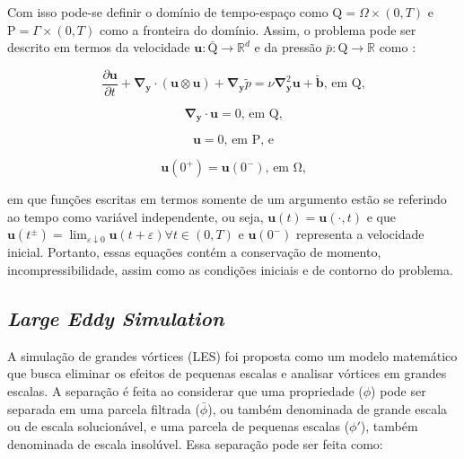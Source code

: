 \documentclass[_ArquivoPrincipal.tex]{subfiles}
\begin{document}
Com isso pode-se definir o domínio de tempo-espaço como $\mathrm{Q}=\Omega\times(0,T)$ e $\mathrm{P}=\Gamma\times(0,T)$ como a fronteira do domínio. Assim, o problema pode ser descrito em termos da velocidade $\mathbf{u}:\bar{\mathrm{Q}}\to\mathbb{R}^d$ e da pressão $\bar{p}:\mathrm{Q}\to\mathbb{R}$ como \cite{hughes2000large}:

\begin{equation}
    \frac{\partial\mathbf{u}}{\partial t}+\mathbf{\nabla}_\mathbf{y}\cdot(\mathbf{u}\otimes\mathbf{u})+\mathbf{\nabla}_\mathbf{y}\tilde{p}=\nu\mathbf{\nabla}^2_\mathbf{y}\mathbf{u}+\tilde{\mathbf{b}}\text{, em }\mathrm{Q}\text{,}
    \label{Sist1}
\end{equation}

\begin{equation}
    \mathbf{\nabla}_\mathbf{y}\cdot\mathbf{u}=0\text{, em }\mathrm{Q}\text{,}
    \label{Sist2}
\end{equation}

\begin{equation}
    \mathbf{u}=0\text{, em }\mathrm{P}\text{, e}
    \label{Sist3}
\end{equation}

\begin{equation}
    \mathbf{u}(0^+)=\mathbf{u}(0^-)\text{, em }\mathrm{\Omega}\text{,}
    \label{Sist4}
\end{equation}

\noindent em que funções escritas em termos somente de um argumento estão se referindo ao tempo como variável independente, ou seja, $\mathbf{u}(t)=\mathbf{u}(\cdot,t)$ e que $\mathbf{u}(t^\pm)=\lim_{\varepsilon\downarrow0}{\mathbf{u}(t+\varepsilon)\forall t\in(0,T)}$ e $\mathbf{u}(0^-)$ representa a velocidade inicial. Portanto, essas equações contém a conservação de momento, incompressibilidade, assim como as condições iniciais e de contorno do problema.

\subsection{\textit{Large Eddy Simulation}} \label{LES}

A simulação de grandes vórtices (LES) foi proposta como um modelo matemático que busca eliminar os efeitos de pequenas escalas e analisar vórtices em grandes escalas. A separação é feita ao considerar que uma propriedade ($\phi$) pode ser separada em uma parcela filtrada ($\bar{\phi}$), ou também denominada de grande escala ou de escala solucionável, e uma parcela de pequenas escalas ($\phi'$), também denominada de escala insolúvel. Essa separação pode ser feita como:
\end{document}
